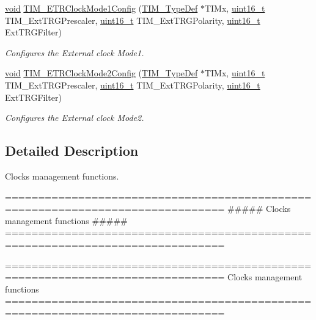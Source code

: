 \begin{DoxyCompactItemize}
\hyperlink{group___n_a_m_e_ga18028b8badbf1ea7e704ccac3c488e82}{void} \hyperlink{group___t_i_m___group6_ga47c05638b93aabcd641dbc8859e1b2df}{T\-I\-M\-\_\-\-E\-T\-R\-Clock\-Mode1\-Config} (\hyperlink{struct_t_i_m___type_def}{T\-I\-M\-\_\-\-Type\-Def} $\ast$T\-I\-Mx, \hyperlink{stdint_8h_a273cf69d639a59973b6019625df33e30}{uint16\-\_\-t} T\-I\-M\-\_\-\-Ext\-T\-R\-G\-Prescaler, \hyperlink{stdint_8h_a273cf69d639a59973b6019625df33e30}{uint16\-\_\-t} T\-I\-M\-\_\-\-Ext\-T\-R\-G\-Polarity, \hyperlink{stdint_8h_a273cf69d639a59973b6019625df33e30}{uint16\-\_\-t} Ext\-T\-R\-G\-Filter)
\begin{DoxyCompactList}\small\item\em Configures the External clock Mode1. \end{DoxyCompactList}\item 
\hyperlink{group___n_a_m_e_ga18028b8badbf1ea7e704ccac3c488e82}{void} \hyperlink{group___t_i_m___group6_ga0a9cbcbab32326cbbdaf4c111f59ec20}{T\-I\-M\-\_\-\-E\-T\-R\-Clock\-Mode2\-Config} (\hyperlink{struct_t_i_m___type_def}{T\-I\-M\-\_\-\-Type\-Def} $\ast$T\-I\-Mx, \hyperlink{stdint_8h_a273cf69d639a59973b6019625df33e30}{uint16\-\_\-t} T\-I\-M\-\_\-\-Ext\-T\-R\-G\-Prescaler, \hyperlink{stdint_8h_a273cf69d639a59973b6019625df33e30}{uint16\-\_\-t} T\-I\-M\-\_\-\-Ext\-T\-R\-G\-Polarity, \hyperlink{stdint_8h_a273cf69d639a59973b6019625df33e30}{uint16\-\_\-t} Ext\-T\-R\-G\-Filter)
\begin{DoxyCompactList}\small\item\em Configures the External clock Mode2. \end{DoxyCompactList}\end{DoxyCompactItemize}


\subsection{Detailed Description}
Clocks management functions. \begin{DoxyVerb} ===============================================================================
                   ##### Clocks management functions #####
 ===============================================================================  \end{DoxyVerb}


\begin{DoxyVerb} ===============================================================================
                         Clocks management functions
 ===============================================================================  \end{DoxyVerb}
 

